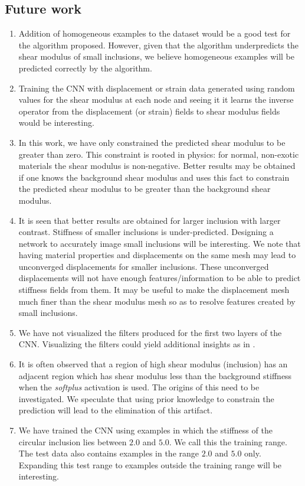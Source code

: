 \documentclass[12pt]{article}
\begin{document}
\subsection{Future work}
\begin{enumerate}
\item{Addition of homogeneous examples to the dataset would be a good test for the algorithm proposed. However, given that the algorithm underpredicts the shear modulus of small inclusions, we believe homogeneous examples will be predicted correctly by the algorithm.}
\item{Training the CNN with displacement or strain data generated using random values for the shear modulus at each node and seeing it it learns the inverse operator from the displacement (or strain) fields to shear modulus fields would be interesting. }
\item{In this work, we have only constrained the predicted shear modulus to be greater than zero. This constraint is rooted in physics: for normal, non-exotic materials the shear modulus is non-negative. Better results may be obtained if one knows the background shear modulus and uses this fact to constrain the predicted shear modulus to be greater than the background shear modulus.}
\item{It is seen that better results are obtained for larger inclusion with larger contrast. Stiffness of smaller inclusions is under-predicted. Designing a network to accurately image small inclusions will be interesting. We note that having material properties and displacements on the same mesh may lead to unconverged displacements for smaller inclusions. These unconverged displacements will not have enough features/information to be able to predict stiffness fields from them. It may be useful to make the displacement mesh much finer than the shear modulus mesh so as to resolve features created by small inclusions.}
\item{We have not visualized the filters produced for the first two layers of the CNN. Visualizing the filters could yield additional insights as in \cite{paper:pateloberai2019}.}
\item{It is often observed that a region of high shear modulus (inclusion) has an adjacent region which has shear modulus less than the background stiffness when the \textit{softplus} activation is used. The origins of this need to be investigated. We speculate that using prior knowledge to constrain the prediction will lead to the elimination of this artifact.}
\item{We have trained the CNN using examples in which the stiffness of the circular inclusion lies between $2.0$ and $5.0$. We call this the training range. The test data also contains examples in the range $2.0$ and $5.0$ only. Expanding this test range to examples outside the training range will be interesting.}

\end{enumerate}
\end{document}
